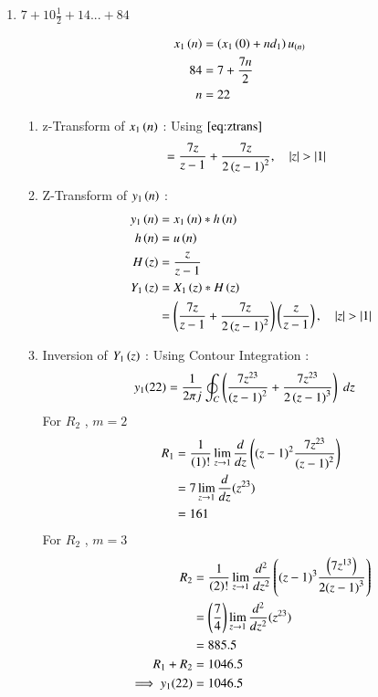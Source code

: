 \documentclass[journal,12pt,onecolumn]{IEEEtran}
\theoremstyle{remark}
\begin{document}
\begin{enumerate}
\item
$ 7 + 10\frac{1}{2} + 14 ... + 84$
\vspace{0.5cm}

\begin{align}
x_1\left(n\right) &= \left(x_1\left(0\right) + nd_1\right)u_{\left(n\right)}\\
84 &= 7+\frac{7n}{2}\\
n &= 22
\end{align}

\begin{enumerate}    
\item 
z-Transform of $x_1\left(n\right)$ :
Using $\eqref{eq:ztrans}$
\begin{align}
&= \frac{7z}{z-1} + \frac{7z}{{2\left(z-1\right)}^{2}} \label{eq:ee25-4}
,\quad \left\vert z\right\vert>\left\vert1\right\vert 
\end{align}
\item
Z-Transform of $y_1\left(n\right)$ :
\begin{align}
    y_1\left(n\right) &= x_1\left(n\right) * h\left(n\right) \\
         h\left(n\right) &= u\left(n\right) \\
                 H\left(z\right) &= \frac{z}{z-1} \label{eq:ee25-9}\\
    Y_1\left(z\right) &= X_1\left(z\right) * H\left(z\right)\\
 &= \left(\frac{7z}{z-1}+
\frac{7z}{2\left(z-1\right)^{2}}\right)\left(\frac{z}{z-1}\right)
,\quad \left\vert z\right\vert>\left\vert1\right\vert     
\end{align}
        \item
Inversion of $Y_1\left(z\right)$ :
Using Contour Integration :
\begin{align}
    y_1{(22)}&=\frac{1}{2\pi j}\oint_{C}\left(\frac{7z^{23}}{\left(z-1\right)^2}+
       \frac{7z^{23}}{2\left(z-1\right)^3}\right) \;dz 
\end{align}
    For $R_2$ , $m=2$ 
\begin{align}
  R_1 &=\frac{1}{\left(1\right)!}\lim\limits_{z\to 1}\frac{d}{dz}\left({(z-1)}^{2}\frac{7z^{23}}{{(z-1)}^2}\right)   \\
    &=7\lim\limits_{z\to 1}\frac{d}{dz}(z^{23})   \\
    &= 161
    \end{align}
    For $R_2$ , $m=3$ 
    \begin{align}
    R_2 &=\frac{1}{\left(2\right)!}\lim\limits_{z\to 1}\frac{d^{2}}{dz^{2}}\left({(z-1)}^{3}\frac{\left(7z^{13}\right)}{{2(z-1)}^3}\right)   \\
    &=\left(\frac{7}{4}\right)\lim\limits_{z\to 1}\frac{d^2}{dz^2}(z^{23})   \\
    &= 885.5\\
    R_1 + R_2 &= 1046.5\\
    \implies  y_1{(22)} &= 1046.5
\end{align}
\end{enumerate}    


\end{enumerate}
\end{document}
